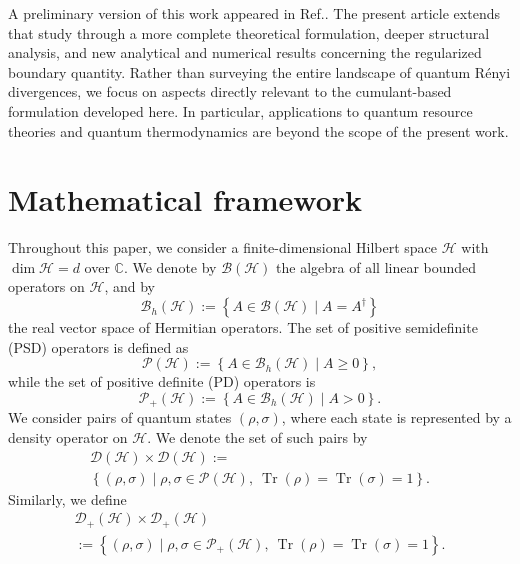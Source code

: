 \documentclass[a4paper, amsfonts, amssymb, amsmath, reprint, showkeys, nofootinbib, twoside, aps, pra]{revtex4-2}
\theoremstyle{definition}
\begin{document}
A preliminary version of this work appeared in
Ref.\cite{MeunsonDeesuwan2025CQRRF}. The present article extends that study through a more complete theoretical formulation, deeper structural analysis, and new analytical and numerical results concerning the regularized boundary quantity. Rather than surveying the entire landscape of quantum Rényi divergences, we focus on aspects directly relevant to the cumulant-based formulation developed here. In particular, applications to quantum resource theories and quantum thermodynamics are beyond the scope of the present work.

\section{Mathematical framework} \label{Math}
Throughout this paper, we consider a finite-dimensional Hilbert space $\mathcal{H}$ with $\dim \mathcal{H} = d$ over $\mathbb{C}$. We denote by $\mathcal{B}(\mathcal{H})$ the algebra of all linear bounded operators on $\mathcal{H}$, and by
\begin{equation}
    \mathcal{B}_h(\mathcal{H}) := \left\{ A \in \mathcal{B}(\mathcal{H}) \mid A = A^{\dagger} \right\}
\end{equation}
the real vector space of Hermitian operators. 
The set of positive semidefinite (PSD) operators is defined as
\begin{equation}
    \mathcal{P}(\mathcal{H}) := \left\{ A \in \mathcal{B}_h(\mathcal{H}) \mid A \ge 0 \right\},
\end{equation}
while the set of positive definite (PD) operators is
\begin{equation}
    \mathcal{P}_+(\mathcal{H}) := \left\{ A \in \mathcal{B}_h(\mathcal{H}) \mid A > 0 \right\}.
\end{equation}
We consider pairs of quantum states $(\rho,\sigma)$, where each state is represented by a density operator on $\mathcal H$. 
We denote the set of such pairs by
\begin{multline}
    \mathcal{D}(\mathcal{H}) \times \mathcal{D}(\mathcal{H}) :=\\
    \left\{ (\rho,\sigma) \mid \rho,\sigma \in \mathcal{P}(\mathcal{H}),\ 
    \operatorname{Tr}(\rho)=\operatorname{Tr}(\sigma)=1 \right\}.
\end{multline}
Similarly, we define
\begin{multline}
    \mathcal{D}_+(\mathcal{H}) \times \mathcal{D}_+(\mathcal{H}) \\
    := \left\{ (\rho,\sigma) \mid \rho,\sigma \in \mathcal{P}_+(\mathcal{H}),\ 
    \operatorname{Tr}(\rho)=\operatorname{Tr}(\sigma)=1 \right\}.
\end{multline}
\end{document}
